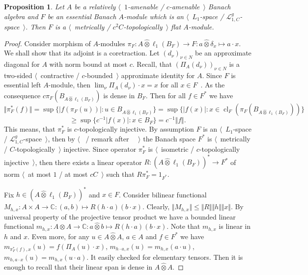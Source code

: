 \documentclass[12pt]{article}
\newtheorem{proposition}[theorem]{Proposition}
\newcommand{\projtens}{\mathbin{\widehat{\otimes}}}
\begin{document}
\begin{proposition}\label{MetTopEssL1FlatModAoverAmenBanAlg} Let $A$ be a
relatively $\langle$~$1$-amenable / $c$-amenable~$\rangle$ Banach algebra and
$F$ be an essential Banach $A$-module which is an $\langle$~$L_1$-space /
$\mathcal{L}_{1,C}^g$-space~$\rangle$. Then $F$ is a $\langle$~metrically /
$c^2C$-topologically~$\rangle$ flat $A$-module.
\end{proposition}
\begin{proof} Consider morphism of $A$-modules $\pi_F:A\projtens \ell_1(B_F)\to
F:a\projtens \delta_x\mapsto a\cdot x$. We shall show that its adjoint is a
coretraction. Let ${(d_\nu)}_{\nu\in N}$ be an approximate diagonal for $A$ with
norm bound at most $c$. Recall, that ${(\Pi_A(d_\nu))}_{\nu\in N}$ is a
two-sided $\langle$~contractive / $c$-bounded~$\rangle$ approximate identity for
$A$. Since $F$ is essential left $A$-module, then $\lim_{\nu}\Pi_A(d_\nu)\cdot
x=x$ for all $x\in F$~\cite[proposition 0.3.15]{HelHomolBanTopAlg}. As the
consequence $c\pi_F(B_{A\projtens\ell_1(B_F)})$ is dense in $B_F$. Then for all
$f\in F^*$ we have
\[
\Vert\pi_F^*(f)\Vert
=\sup \{|f(\pi_F(u))|:u\in B_{A\projtens\ell_1(B_F)} \}
=\sup \{|f(x)|:x\in \operatorname{cl}_F(\pi_F(B_{A\projtens\ell_1(B_F)})) \}
\]
\[
\geq\sup \{c^{-1}|f(x)|:x\in B_F \}=c^{-1}\Vert f\Vert.
\]
This means, that $\pi_F^*$ is $c$-topologically injective. By assumption $F$ is
an $\langle$~$L_1$-space / $\mathcal{L}_{1,C}^g$-space~$\rangle$, then by
$\langle$~\cite[theorem 1]{GrothMetrProjFlatBanSp} / remark after
~\cite[corollary 23.5(1)]{DefFloTensNorOpId}~$\rangle$ the Banach space $F^*$ is
$\langle$~metrically / $C$-topologically~$\rangle$ injective. Since operator
$\pi_F^*$ is $\langle$~isometric / $c$-topologically injective~$\rangle$, then
there exists a linear operator $R:{(A\projtens\ell_1(B_F))}^*\to F^*$ of norm
$\langle$~at most $1$ / at most $cC$~$\rangle$ such that $R\pi_F^*=1_{F^*}$.

Fix $h\in {(A\projtens\ell_1(B_F))}^*$ and $x\in F$. Consider bilinear
functional $M_{h,x}:A\times A\to\mathbb{C}:(a,b)\mapsto R(h\cdot a)(b\cdot x)$.
Clearly, $\Vert M_{h,x}\Vert\leq\Vert R\Vert\Vert h\Vert\Vert x\Vert$. By
universal property of the projective tensor product we have a bounded linear
functional $m_{h,x}:A\projtens A\to\mathbb{C}:a\projtens b\mapsto R(h\cdot
a)(b\cdot x)$. Note that $m_{h,x}$ is linear in $h$ and $x$. Even more, for any
$u\in A\projtens A$, $a\in A$ and $f\in F^*$ we have
$m_{\pi_F^*(f),x}(u)=f(\Pi_A(u)\cdot x)$, $m_{h\cdot a,x}(u)=m_{h,x}(a\cdot u)$,
$m_{h,a\cdot x}(u)=m_{h,x}(u\cdot a)$. It easily checked for elementary tensors.
Then it is enough to recall that their linear span is dense in $A\projtens A$.


\end{proof}
\end{document}

